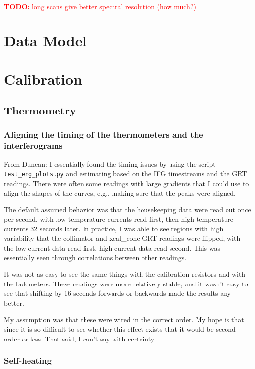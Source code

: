 \documentclass[notitlepage]{report}
\newcommand{\todo}[1]{\textcolor{red}{\textbf{TODO:} #1}}
\begin{document}
\todo{long scans give better spectral resolution (how much?)}



\chapter{Data Model}


\chapter{Calibration}

\section{Thermometry}

\subsection{Aligning the timing of the thermometers and the interferograms}

From Duncan: I essentially found the timing issues by using the script \texttt{test\_eng\_plots.py} and estimating based on the IFG timestreams and the GRT readings. There were often some readings with large gradients that I could use to align the shapes of the curves, e.g., making sure that the peaks were aligned.

The default assumed behavior was that the housekeeping data were read out once per second, with low temperature currents read first, then high temperature currents 32 seconds later. In practice, I was able to see regions with high variability that the collimator and xcal\_cone GRT readings were flipped, with the low current data read first, high current data read second. This was essentially seen through correlations between other readings.

It was not as easy to see the same things with the calibration resistors and with the bolometers. These readings were more relatively stable, and it wasn't easy to see that shifting by 16 seconds forwards or backwards made the results any better.

My assumption was that these were wired in the correct order. My hope is that since it is so difficult to see whether this effect exists that it would be second-order or less. That said, I can't say with certainty.

\subsection{Self-heating}
\end{document}
